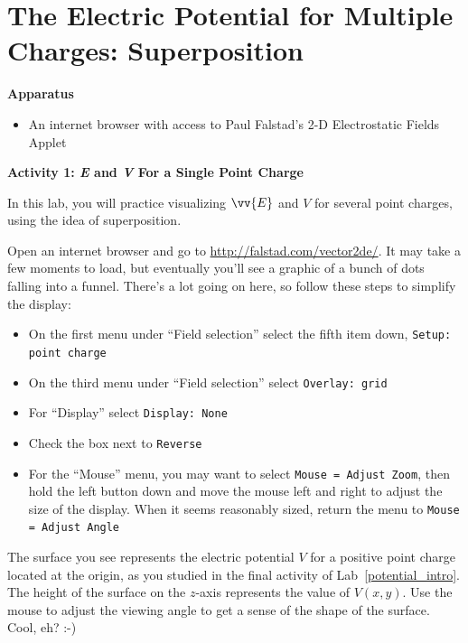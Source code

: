 \section{The Electric Potential for Multiple Charges: Superposition}
\label{potential_superposition}


\makelabheader %

\bigskip

\textbf{Apparatus}

\begin{itemize}[nosep]
\item An internet browser with access to Paul Falstad's 2-D Electrostatic Fields Applet
\end{itemize}

\bigskip

\textbf{Activity 1: \textit{E} and \textit{V} For a Single Point Charge}

In this lab, you will practice visualizing $\vv{E}$ and $V$ for several point charges, using the idea of superposition.

Open an internet browser and go to \href{http://falstad.com/vector2de/}{http://falstad.com/vector2de/}.  It may take a few moments to load, but eventually you'll see a graphic of a bunch of dots falling into a funnel.  There's a lot going on here, so follow these steps to simplify the display:
\begin{itemize}[nosep]
\item On the first menu under ``Field selection'' select the fifth item down, \verb!Setup: point charge!
\item On the third menu under ``Field selection'' select \verb!Overlay: grid!
\item For ``Display'' select \verb!Display: None!
\item Check the box next to \verb!Reverse!
\item For the ``Mouse'' menu, you may want to select \verb!Mouse = Adjust Zoom!, then hold the left button down and move the mouse left and right to adjust the size of the display.  When it seems reasonably sized, return the menu to \verb!Mouse = Adjust Angle!
\end{itemize}

The surface you see represents the electric potential $V$ for a positive point charge located at the origin, as you studied in the final activity of Lab~\ref{potential_intro}.  The height of the surface on the $z$-axis represents the value of $V(x,y)$.  Use the mouse to adjust the viewing angle to get a sense of the shape of the surface.  Cool, eh?  :-)

